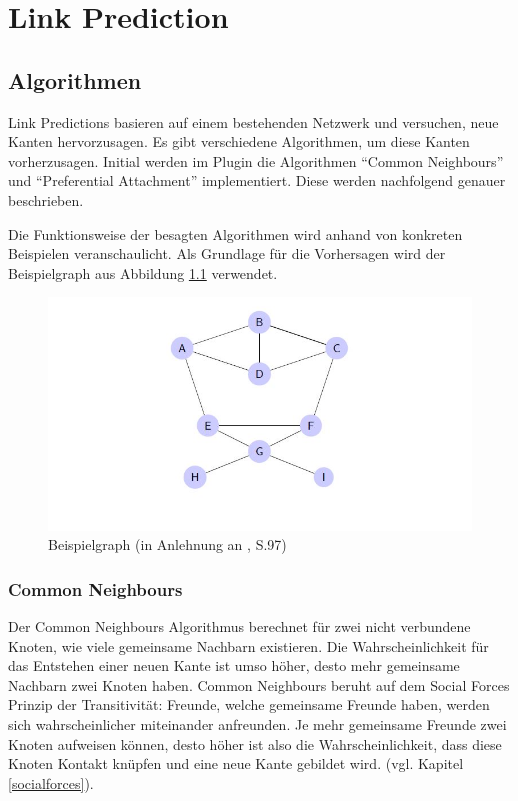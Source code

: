 \chapter{Link Prediction}

\section{Algorithmen}
Link Predictions basieren auf einem bestehenden Netzwerk und versuchen, neue Kanten hervorzusagen.
Es gibt verschiedene Algorithmen, um diese Kanten vorherzusagen.
Initial werden im Plugin die Algorithmen ``Common Neighbours'' und ``Preferential Attachment'' implementiert. Diese werden nachfolgend genauer beschrieben.

Die Funktionsweise der besagten Algorithmen wird anhand von konkreten Beispielen veranschaulicht.
Als Grundlage für die Vorhersagen wird der Beispielgraph aus Abbildung \ref{fig:graph_bsp} verwendet.

\begin{figure}[h]
    \centering
    \includegraphics[scale=0.7]{resources/graph_example.JPG}
    \caption{Beispielgraph (in Anlehnung an \citeauthor{michael_henninger_soziale_2018} \citeyear{michael_henninger_soziale_2018}, S.97)}
    \label{fig:graph_bsp}
\end{figure}

\subsection{Common Neighbours}
Der Common Neighbours Algorithmus berechnet für zwei nicht verbundene Knoten, wie viele gemeinsame Nachbarn existieren.
Die Wahrscheinlichkeit für das Entstehen einer neuen Kante ist umso höher, desto mehr gemeinsame Nachbarn zwei
Knoten haben. Common Neighbours beruht auf dem Social Forces Prinzip der Transitivität: Freunde, welche gemeinsame
Freunde haben, werden sich wahrscheinlicher miteinander anfreunden. Je mehr gemeinsame Freunde zwei Knoten aufweisen können, desto
höher ist also die Wahrscheinlichkeit, dass diese Knoten Kontakt knüpfen und eine neue Kante gebildet wird. (vgl. Kapitel \ref{socialforces}).

